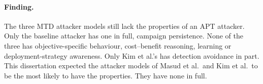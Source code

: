 \documentclass{cshonours}
\begin{document}
\paragraph{Finding.} The three MTD attacker models still lack the
properties of an APT attacker. Only the baseline attacker has one in full, campaign persistence. None of
the three has objective-specific behaviour, cost--benefit reasoning, learning or deployment-strategy
awareness. Only Kim et al.'s has detection avoidance in part. This dissertation
expected the attacker models of Masud et al.\ and Kim et al.\ to be the most likely to have the properties. They have none in full.
\end{document}
